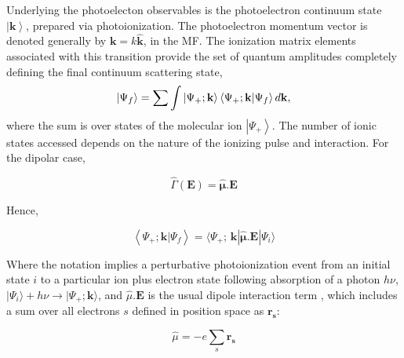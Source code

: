 \documentclass[10pt]{article}
\begin{document}
Underlying the photoelecton observables is the photoelectron continuum state $\left|\mathbf{k}\right>$, prepared via photoionization.
The photoelectron momentum vector is denoted generally by $\boldsymbol{\mathbf{k}}=k\mathbf{\hat{k}}$, in the MF. %
The ionization matrix elements associated with this transition %
provide the set of quantum amplitudes completely defining the final continuum scattering state,
\begin{equation}
\left|\Psi_f\right> = \sum{\int{\left|\Psi_{+};\bf{k}\right>\left<\Psi_{+};\mathbf{k}|\Psi_f\right> d\bf{k}}},
\label{eq:cstate}
\end{equation}
where the sum is over states of the molecular ion $\left|\Psi_{+}\right>$. The number of ionic states accessed depends on the nature of the ionizing pulse and interaction. For the dipolar case,

\begin{equation}
\hat{\Gamma}(\boldsymbol{\mathbf{E}}) = \hat{\mathbf{\mu}}.\boldsymbol{\mathbf{E}}
\end{equation}

Hence,

\begin{equation}
\left<\Psi_{+};\mathbf{k}|\Psi_f\right> =\langle\Psi_{+};\,\mathbf{k}|\hat{\mathbf{\mu}}.\boldsymbol{\mathbf{E}}|\Psi_{i}\rangle
\label{eq:matE-dipole}
\end{equation}

Where the notation implies a perturbative photoionization event from an initial state $i$ to a particular ion plus electron state following absorption of a photon $h\nu$, %
$|\Psi_{i}\rangle+h\nu{\rightarrow}|\Psi_{+};\boldsymbol{\mathbf{k}}\rangle$, and $\hat{\mu}.\boldsymbol{\mathbf{E}}$ is the usual dipole interaction term \cite{qOptics}, which includes a sum over all electrons $s$ defined in position space as $\mathbf{r_{s}}$:  

\begin{equation}
\hat{\mu}=-e\sum_{s}\mathbf{r_{s}}
\label{eq:dipole-operator}
\end{equation}
\end{document}
